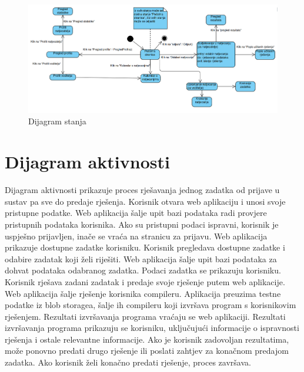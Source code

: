 			\begin{figure}[H]
				\includegraphics[width=\linewidth]{slike/dijagram_stanja.png} 
				\centering
				\caption{Dijagram stanja}
				\label{fig:stanja}
			\end{figure}
			
			\eject 
		
		\section{Dijagram aktivnosti}
			
			Dijagram aktivnosti prikazuje proces rješavanja jednog zadatka od prijave u sustav pa sve do predaje rješenja. Korisnik otvara web aplikaciju i unosi svoje pristupne podatke. Web aplikacija šalje upit bazi podataka radi provjere pristupnih podataka korisnika. Ako su pristupni podaci ispravni, korisnik je uspješno prijavljen, inače se vraća na stranicu za prijavu. Web aplikacija prikazuje dostupne zadatke korisniku. Korisnik pregledava dostupne zadatke i odabire zadatak koji želi riješiti. Web aplikacija šalje upit bazi podataka za dohvat podataka odabranog zadatka. Podaci zadatka se prikazuju korisniku. Korisnik rješava zadani zadatak i predaje svoje rješenje putem web aplikacije. Web aplikacija šalje rješenje korisnika compileru. Aplikacija preuzima testne podatke iz blob storagea, šalje ih compileru koji izvršava program s korisnikovim rješenjem. Rezultati izvršavanja programa vraćaju se web aplikaciji. Rezultati izvršavanja programa prikazuju se korisniku, uključujući informacije o ispravnosti rješenja i ostale relevantne informacije. Ako je korisnik zadovoljan rezultatima, može ponovno predati drugo rješenje ili poslati zahtjev za konačnom predajom zadatka. Ako korisnik želi konačno predati rješenje, proces završava.
			\eject
			
